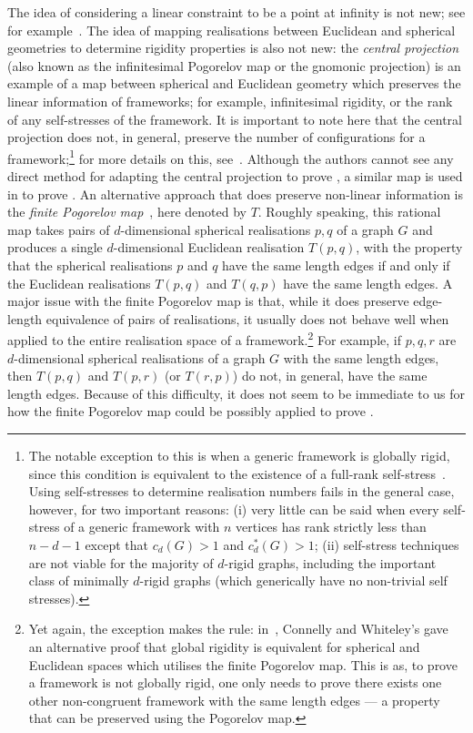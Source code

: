 \documentclass[ALCO]{cedram}
\begin{document}
The idea of considering a linear constraint to be a point at infinity is not new;
see for example~\cite{EJNSTW19}.
The idea of mapping realisations between Euclidean and spherical geometries to determine rigidity properties is also not new: the \emph{central projection}~\cite{Izm09,Pog73} (also known as the infinitesimal Pogorelov map or the gnomonic projection) is an example of a map between spherical and Euclidean geometry which preserves the linear information of frameworks; for example, infinitesimal rigidity, or the rank of any self-stresses of the framework.
It is important to note here that the central projection does not, in general, preserve the number of configurations for a framework;\footnote{The notable exception to this is when a generic framework is globally rigid,
since this condition is equivalent to the existence of a full-rank self-stress~\cite{Gortler2014}. Using self-stresses to determine realisation numbers fails in the general case, however, for two important reasons:
(i) very little can be said when every self-stress of a generic framework with $n$ vertices has rank strictly less than $n-d-1$ except that $c_d(G)>1$ and $c_d^*(G)>1$; (ii) self-stress techniques are not viable for the majority of $d$-rigid graphs, including the important class of minimally $d$-rigid graphs (which generically have no non-trivial self stresses).} for more details on this, see~\cite[Section 8]{cw10}.
Although the authors cannot see any direct method for adapting the central projection to prove ,
a similar map is used in  to prove .
An alternative approach that does preserve non-linear information is the \emph{finite Pogorelov map}~\cite{Izm09,Pog73}, here denoted by $T$.
Roughly speaking, this rational map takes pairs of $d$-dimensional spherical realisations $p,q$ of a graph $G$ and produces a single $d$-dimensional Euclidean realisation $T(p,q)$, with the property that the spherical realisations $p$ and $q$ have the same length edges if and only if the Euclidean realisations $T(p,q)$ and $T(q,p)$ have the same length edges.
A major issue with the finite Pogorelov map is that,
while it does preserve edge-length equivalence of pairs of realisations,
it usually does not behave well when applied to the entire realisation space of a framework.\footnote{Yet again, the exception makes the rule: in~\cite[Section 7]{cw10}, Connelly and Whiteley's gave an alternative proof that global rigidity is equivalent for spherical and Euclidean spaces which utilises the finite Pogorelov map.
This is as, to prove a framework is not globally rigid, one only needs to prove there exists one other non-congruent framework with the same length edges --- a property that can be preserved using the Pogorelov map.}
For example,
if $p,q,r$ are $d$-dimensional spherical realisations of a graph $G$ with the same length edges,
then $T(p,q)$ and $T(p,r)$ (or $T(r,p)$) do not, in general, have the same length edges.
Because of this difficulty, it does not seem to be immediate to us for how the finite Pogorelov map could be possibly applied to prove .
\end{document}
